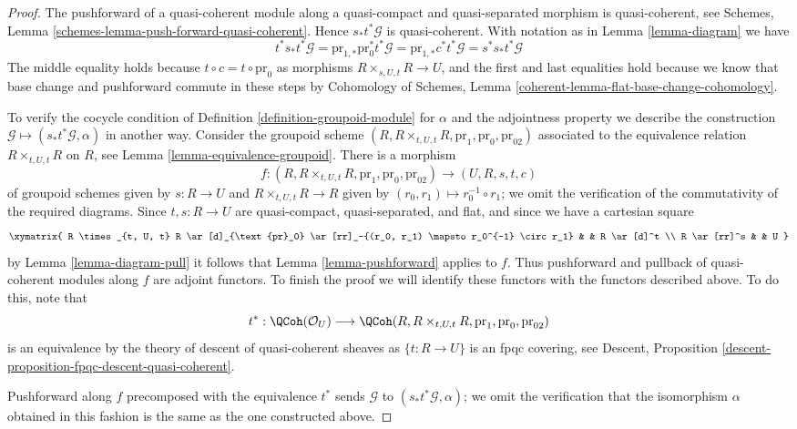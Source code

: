 \begin{proof}
The pushforward of a quasi-coherent module along a quasi-compact and
quasi-separated morphism is quasi-coherent, see Schemes, Lemma
\ref{schemes-lemma-push-forward-quasi-coherent}. Hence $s_*t^*\mathcal{G}$
is quasi-coherent. With notation as in Lemma \ref{lemma-diagram} we have
$$
t^*s_*t^*\mathcal{G} =
\text{pr}_{1, *}\text{pr}_0^*t^*\mathcal{G} =
\text{pr}_{1, *}c^*t^*\mathcal{G} =
s^*s_*t^*\mathcal{G}
$$
The middle equality holds because $t \circ c = t \circ \text{pr}_0$ as
morphisms $R \times_{s, U, t} R \to U$, and the first and last
equalities hold because we know that base change and pushforward commute in
these steps by Cohomology of Schemes, Lemma
\ref{coherent-lemma-flat-base-change-cohomology}.

\medskip\noindent
To verify the cocycle condition of Definition \ref{definition-groupoid-module}
for $\alpha$ and the adjointness property we describe the construction
$\mathcal{G} \mapsto (s_*t^*\mathcal{G}, \alpha)$ in another way.
Consider the groupoid scheme
$(R, R \times_{t, U, t} R, \text{pr}_1, \text{pr}_0, \text{pr}_{02})$
associated to the equivalence relation $R \times_{t, U, t} R$
on $R$, see Lemma \ref{lemma-equivalence-groupoid}.
There is a morphism
$$
f :
(R, R \times_{t, U, t} R, \text{pr}_1, \text{pr}_0, \text{pr}_{02})
\longrightarrow
(U, R, s, t, c)
$$
of groupoid schemes given by $s : R \to U$ and $R \times_{t, U, t} R \to R$
given by $(r_0, r_1) \mapsto r_0^{-1} \circ r_1$; we omit the verification
of the commutativity of the required diagrams. Since
$t, s : R \to U$ are quasi-compact, quasi-separated, and flat,
and since we have a cartesian square
$$
\xymatrix{
R \times_{t, U, t} R \ar[d]_{\text{pr}_0}
\ar[rr]_-{(r_0, r_1) \mapsto r_0^{-1} \circ r_1} & & R \ar[d]^t \\
R \ar[rr]^s & & U
}
$$
by Lemma \ref{lemma-diagram-pull} it follows that
Lemma \ref{lemma-pushforward} applies to $f$.
Thus pushforward and pullback of quasi-coherent modules along
$f$ are adjoint functors. To finish the proof we will identify these functors
with the functors described above. To do this, note that
$$
t^* :
\QCoh(\mathcal{O}_U)
\longrightarrow
\QCoh(R, R \times_{t, U, t} R, \text{pr}_1, \text{pr}_0, \text{pr}_{02})
$$
is an equivalence by the theory of descent of quasi-coherent sheaves as
$\{t : R \to U\}$ is an fpqc covering, see
Descent, Proposition \ref{descent-proposition-fpqc-descent-quasi-coherent}.

\medskip\noindent
Pushforward along $f$ precomposed with the equivalence $t^*$ sends
$\mathcal{G}$ to $(s_*t^*\mathcal{G}, \alpha)$;
we omit the verification that the isomorphism $\alpha$
obtained in this fashion is the same as the one constructed above.


\end{proof}
